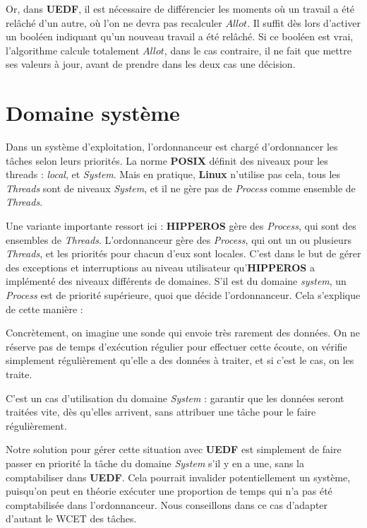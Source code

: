 		Or, dans \textbf{UEDF}, il est nécessaire de différencier les moments où un travail a été relâché 
		d'un autre, où l'on ne devra pas recalculer $Allot$. Il suffit dès lors d'activer un 
		booléen indiquant qu'un nouveau travail a été relâché. Si ce booléen est vrai, 
		l'algorithme calcule totalement $Allot$, dans le cas contraire, il ne fait que mettre ses valeurs à 
		jour, avant de prendre dans les deux cas une décision.\newline
	
	\section{Domaine système}
	Dans un système d'exploitation, l'ordonnanceur est chargé d'ordonnancer les tâches selon leurs priorités. 
	La norme \textbf{POSIX} définit des niveaux pour les threads : \textit{local}, et \textit{System}. 
	Mais en pratique, \textbf{Linux} n'utilise pas cela, tous les \textit{Threads} sont 
	de niveaux \textit{System}, et il ne gère pas de \textit{Process} comme ensemble de \textit{Threads}.\newline

	Une variante importante ressort ici : \textbf{HIPPEROS} gère des \textit{Process}, 
	qui sont des ensembles de \textit{Threads}. L'ordonnanceur gère des \textit{Process}, qui ont un ou plusieurs \textit{Threads}, 
	et les priorités pour chacun d'eux sont locales.
	C'est dans le but de gérer des exceptions et interruptions au niveau utilisateur qu'\textbf{HIPPEROS } a implémenté 
	des niveaux différents de domaines. S'il est du domaine \textit{system}, un \textit{Process }est de priorité supérieure, quoi que décide 
	l'ordonnanceur. Cela s'explique de cette manière :\newline

	Concrètement, on imagine une sonde qui envoie très rarement des données. On ne réserve 
	pas de temps d'exécution régulier pour effectuer cette écoute, 
	on vérifie simplement régulièrement qu'elle a des données à traiter, et si c'est le cas, on les traite.\newline
	
	C'est un cas d'utilisation du domaine \textit{System} : garantir que les données seront traitées vite, dès qu'elles arrivent, 
	sans attribuer une tâche pour le faire régulièrement.\newline
	
	Notre solution pour gérer cette situation avec \textbf{UEDF} est simplement de faire passer en priorité 
	la tâche du domaine \textit{System} s'il y en a une, sans la comptabiliser dans \textbf{UEDF}. 
	Cela pourrait invalider potentiellement un système, puisqu'on peut en théorie 
	exécuter une proportion de temps qui n'a pas été comptabilisée dans l'ordonnanceur. 
	Nous conseillons dans ce cas d'adapter d'autant le WCET des tâches.
